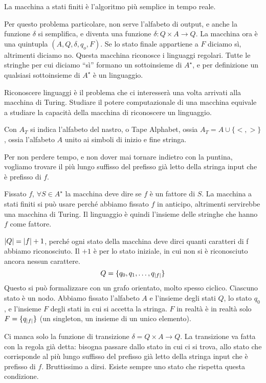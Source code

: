 La macchina a stati finiti \`e l'algoritmo pi\`u semplice in tempo reale.

Per questo problema particolare, non serve l'alfabeto di output, e anche la funzione $\delta$ si semplifica, e diventa una funzione $\delta : Q \times A \to Q$. La macchina ora \`e una quintupla $(A, Q, \delta, q_o, F)$. Se lo stato finale appartiene a $F$ diciamo s\`i, altrimenti diciamo no. Questa macchina riconosce i linguaggi regolari. Tutte le stringhe per cui diciamo ``s\`i'' formano un sottoinsieme di $A^{\star}$, e per definizione un qualsiasi sottoinsieme di $A^{\star}$ \`e un linguaggio.

Riconoscere linguaggi \`e il problema che ci interesser\`a una volta arrivati alla macchina di Turing. Studiare il potere computazionale di una macchina equivale a studiare la capacit\`a della macchina di riconoscere un linguaggio.

Con $A_T$ si indica l'alfabeto del nastro, o Tape Alphabet, ossia $A_T = A \cup \{ <, > \}$, ossia l'alfabeto $A$ unito ai simboli di inizio e fine stringa.

Per non perdere tempo, e non dover mai tornare indietro con la puntina, vogliamo trovare il pi\`u lungo suffisso del prefisso gi\`a letto della stringa input che \`e prefisso di $f$. 

Fissato $f$, $\forall S \in A^{\star}$ la macchina deve dire se $f$ \`e un fattore di $S$. La macchina a stati finiti si pu\`o usare perch\'e abbiamo fissato $f$ in anticipo, altrimenti servirebbe una macchina di Turing. Il linguaggio \`e quindi l'insieme delle stringhe che hanno $f$ come fattore.

$\left\lvert{Q}\right\rvert = \left\lvert{f}\right\rvert + 1$, perch\'e ogni stato della macchina deve dirci quanti caratteri di f abbiamo riconosciuto. Il $+1$ \`e per lo stato iniziale, in cui non si \`e riconosciuto ancora nessun carattere.
\[
Q = \{q_0, q_1, \ldots, q_{\left\lvert{f}\right\rvert}\}
\]
Questo si pu\`o formalizzare con un grafo orientato, molto spesso ciclico. Ciascuno stato \`e un nodo. Abbiamo fissato l'alfabeto $A$ e l'insieme degli stati $Q$, lo stato $q_0$, e l'insieme $F$ degli stati in cui si accetta la stringa. $F$ in realt\`a \`e in realt\`a solo $F = \{ q_{\left\lvert{f}\right\rvert} \}$ (un singleton, un insieme di un unico elemento).

Ci manca solo la funzione di transizione $\delta = Q \times A \to Q$. La transizione va fatta con la regola gi\`a detta: bisogna passare dallo stato in cui ci si trova, allo stato che corrisponde al pi\`u lungo suffisso del prefisso gi\`a letto della stringa input che \`e prefisso di $f$. Bruttissimo a dirsi. Esiste sempre uno stato che rispetta questa condizione.

